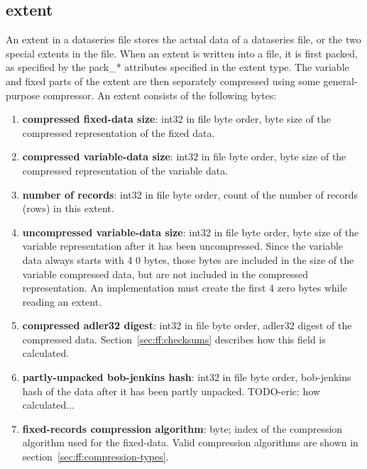 \subsection{extent}

An extent in a dataseries file stores the actual data of a dataseries
file, or the two special extents in the file.  When an extent is
written into a file, it is first packed, as specified by the pack\_*
attributes specified in the extent type.  The variable and fixed parts
of the extent are then separately compressed using some
general-purpose compressor.  An extent consists of the following
bytes:

\begin{enumerate}

  \item {\bf compressed fixed-data size}: int32 in file byte order,
    byte size of the compressed representation of the fixed data.

  \item {\bf compressed variable-data size}: int32 in file byte order,
    byte size of the compressed representation of the variable data.

  \item {\bf number of records}: int32 in file byte order, count of
    the number of records (rows) in this extent.

  \item {\bf uncompressed variable-data size}: int32 in file byte order, 
    byte size of the variable representation after it has been uncompressed.
    Since the variable data always starts with 4 0 bytes, those bytes are 
    included in the size of the variable compressed data, but are not included
    in the compressed representation.  An implementation must create the first
    4 zero bytes while reading an extent.

  \item {\bf compressed adler32 digest}: int32 in file byte order,
    adler32 digest of the compressed data.
    Section~\ref{sec:ff:checksums} describes how this field is calculated.

  \item {\bf partly-unpacked bob-jenkins hash}: int32 in file byte order,
    bob-jenkins hash of the data after it has been partly unpacked.
    TODO-eric: how calculated...

  \item {\bf fixed-records compression algorithm}: byte; index of the
    compression algorithm used for the fixed-data.  Valid compression algorithms
    are shown in section~\ref{sec:ff:compression-types}.


\end{enumerate}
